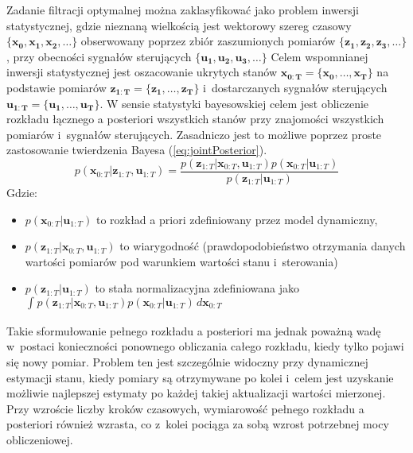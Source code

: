 Zadanie filtracji optymalnej można zaklasyfikować jako problem inwersji statystycznej, gdzie nieznaną wielkością jest wektorowy szereg czasowy $\{\boldsymbol{x_0}, \boldsymbol{x_1}, \boldsymbol{x_2}, \dots\}$ obserwowany poprzez zbiór zaszumionych pomiarów $\{\boldsymbol{z_1}, \boldsymbol{z_2}, \boldsymbol{z_3}, \dots\}$, przy obecności sygnałów sterujących $\{\boldsymbol{u_1}, \boldsymbol{u_2}, \boldsymbol{u_3}, \dots\}$ Celem wspomnianej inwersji statystycznej jest oszacowanie ukrytych stanów $\boldsymbol{x_{0:T}}=\{\boldsymbol{x_0}, \dots, \boldsymbol{x_T}\}$ na podstawie pomiarów $\boldsymbol{z_{1:T}}=\{\boldsymbol{z_1}, \dots, \boldsymbol{z_T}\}$ i~dostarczanych sygnałów sterujących $\boldsymbol{u_{1:T}}=\{\boldsymbol{u_1}, \dots, \boldsymbol{u_T}\}$. W sensie statystyki bayesowskiej celem jest obliczenie rozkładu łącznego a posteriori wszystkich stanów przy znajomości wszystkich pomiarów i~sygnałów sterujących. Zasadniczo jest to możliwe poprzez proste zastosowanie twierdzenia Bayesa (\ref{eq:jointPosterior}).
\begin{equation} \label{eq:jointPosterior}
p(\boldsymbol{x}_{0:T}|\boldsymbol{z}_{1:T},\boldsymbol{u}_{1:T})=\frac{p(\boldsymbol{z}_{1:T}|\boldsymbol{x}_{0:T},\boldsymbol{u}_{1:T})p(\boldsymbol{x}_{0:T}|\boldsymbol{u}_{1:T})}{p(\boldsymbol{z}_{1:T}|\boldsymbol{u}_{1:T})}
\end{equation}
Gdzie:
\begin{itemize}
	\item $p(\boldsymbol{x}_{0:T}|\boldsymbol{u}_{1:T})$ to rozkład a priori zdefiniowany przez model dynamiczny,
	\item $p(\boldsymbol{z}_{1:T}|\boldsymbol{x}_{0:T},\boldsymbol{u}_{1:T})$ to wiarygodność (prawdopodobieństwo otrzymania danych wartości pomiarów pod warunkiem wartości stanu i~sterowania)
	\item $p(\boldsymbol{z}_{1:T}|\boldsymbol{u}_{1:T})$ to stała normalizacyjna zdefiniowana jako 
	$\int_{}^{}p(\boldsymbol{z}_{1:T}|\boldsymbol{x}_{0:T},\boldsymbol{u}_{1:T})p(\boldsymbol{x}_{0:T}|\boldsymbol{u}_{1:T})\,d\boldsymbol{x}_{0:T}$
\end{itemize}
\par Takie sformułowanie pełnego rozkładu a posteriori ma jednak poważną wadę w~postaci konieczności ponownego obliczania całego rozkładu, kiedy tylko pojawi się nowy pomiar. Problem ten jest szczególnie widoczny przy dynamicznej estymacji stanu, kiedy pomiary są otrzymywane po kolei i~celem jest uzyskanie możliwie najlepszej estymaty po każdej takiej aktualizacji wartości mierzonej. Przy wzroście liczby kroków czasowych, wymiarowość pełnego rozkładu a posteriori również wzrasta, co z~kolei pociąga za sobą wzrost potrzebnej mocy obliczeniowej.
